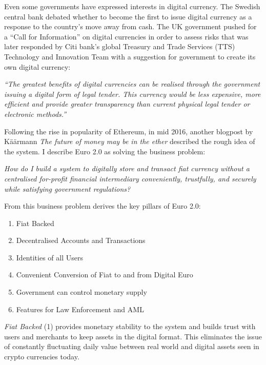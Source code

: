 \documentclass[a4paper,12pt]{article} %
\begin{document}
{{Even some governments have expressed interests in digital currency. The Swedish central bank debated whether to become the first to issue digital currency as a response to the country's move away from cash\cite{milne2016sweden}. The UK government pushed for a ``Call for Information'' on digital currencies in order to assess risks\cite{nermin2014ukcall} that was later responded by Citi bank's global Treasury and Trade Services (TTS) Technology and Innovation Team with a suggestion for government to create its own digital currency\cite{spaven2015ukcurrency}:

\begin{quoting}
	\textit{``The greatest benefits of digital currencies can be realised through the government issuing a digital form of legal tender. This currency would be less expensive, more efficient and provide greater transparency than current physical legal tender or electronic methods.''}
\end{quoting}

Following the rise in popularity of Ethereum, in mid 2016, another blogpost by Käärmann \textit{The future of money may be in the ether}\cite{kaarmann2016ether} described the rough idea of the system. I describe Euro 2.0 as solving the business problem:

\begin{quoting}
	\textit{How do I build a system to digitally store and transact fiat currency without a centralised for-profit financial intermediary conveniently, trustfully, and securely while satisfying government regulations?}
\end{quoting}

From this business problem derives the key pillars of Euro 2.0:

\begin{enumerate}
	\item Fiat Backed
	\item Decentralised Accounts and Transactions
	\item Identities of all Users
	\item Convenient Conversion of Fiat to and from Digital Euro
	\item Government can control monetary supply
	\item Features for Law Enforcement and AML
\end{enumerate}

\textit{Fiat Backed} (1) provides monetary stability to the system and builds trust with users and merchants to keep assets in the digital format. This eliminates the issue of constantly fluctuating daily value between real world and digital assets seen in crypto currencies today.

}}
\end{document}
